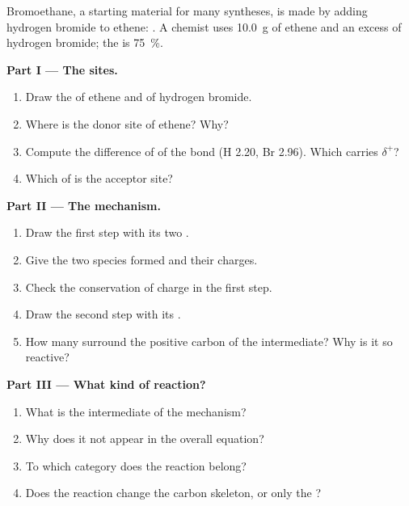 \begin{problem}
\label{pb:g12:curly-arrows:1}
Bromoethane, a starting material for many syntheses, is made by adding
hydrogen bromide to ethene: . A chemist
uses \qty{10.0}{g} of ethene and an excess of hydrogen bromide; the
 is \qty{75}{\percent}.

\medskip
\noindent\textbf{Part I --- The sites.}
\begin{enumerate}
  \item Draw the  of ethene and of hydrogen bromide.
  \item Where is the donor site of ethene? Why?
  \item Compute the difference of  of the  bond
        (H 2.20, Br 2.96). Which  carries $\delta^+$?
  \item Which  of  is the acceptor site?
\end{enumerate}

\medskip
\noindent\textbf{Part II --- The mechanism.}
\begin{enumerate}[resume]
  \item Draw the first step with its two .
  \item Give the two species formed and their charges.
  \item Check the conservation of charge in the first step.
  \item Draw the second step with its .
  \item How many  surround the positive carbon of the
        intermediate? Why is it so reactive?
\end{enumerate}

\medskip
\noindent\textbf{Part III --- What kind of reaction?}
\begin{enumerate}[resume]
  \item What is the intermediate of the mechanism?
  \item Why does it not appear in the overall equation?
  \item To which category does the reaction belong?
  \item Does the reaction change the carbon skeleton, or only the
        ?
\end{enumerate}


\end{problem}
